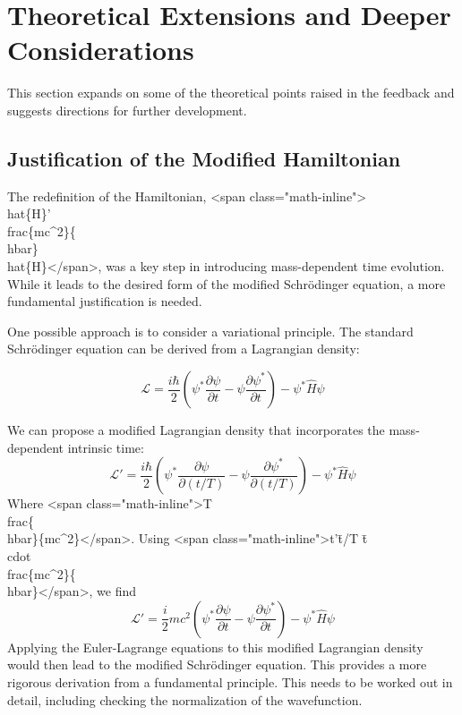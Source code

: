 \documentclass{article}
\begin{document}
{{{{				\section{Theoretical Extensions and Deeper Considerations}
				
				This section expands on some of the theoretical points raised in the feedback and suggests directions for further development.
				
				\subsection{Justification of the Modified Hamiltonian}
				
				The redefinition of the Hamiltonian, <span class="math-inline">\\hat\{H\}' \= \\frac\{mc^2\}\{\\hbar\}\\hat\{H\}</span>, was a key step in introducing mass-dependent time evolution.  While it leads to the desired form of the modified Schrödinger equation, a more fundamental justification is needed.
				
				One possible approach is to consider a variational principle.  The standard Schrödinger equation can be derived from a Lagrangian density:
				
				\begin{equation}
					\mathcal{L} = \frac{i\hbar}{2} \left( \psi^* \frac{\partial \psi}{\partial t} - \psi \frac{\partial \psi^*}{\partial t} \right) - \psi^* \hat{H} \psi
				\end{equation}
				
				We can propose a modified Lagrangian density that incorporates the mass-dependent intrinsic time:
				\begin{equation}
					\mathcal{L}' =  \frac{i\hbar}{2} \left(\psi^*\frac{\partial \psi}{\partial (t/T)} - \psi\frac{\partial \psi^*}{\partial(t/T)}\right) - \psi^* \hat{H}\psi
				\end{equation}
				Where <span class="math-inline">T \= \\frac\{\\hbar\}\{mc^2\}</span>.
				Using <span class="math-inline">t'\=t/T \= t \\cdot \\frac\{mc^2\}\{\\hbar\}</span>, we find
				\begin{equation}
					\mathcal{L}' = \frac{i}{2}mc^2\left(\psi^*\frac{\partial\psi}{\partial t} - \psi \frac{\partial \psi^*}{\partial t}\right) - \psi^*\hat{H}\psi
				\end{equation}
				Applying the Euler-Lagrange equations to this modified Lagrangian density would then lead to the modified Schrödinger equation. This provides a more rigorous derivation from a fundamental principle.  This needs to be worked out in detail, including checking the normalization of the wavefunction.
				
}}}}
\end{document}
